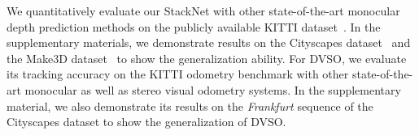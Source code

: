 \documentclass[runningheads]{llncs}
\begin{document}
We quantitatively evaluate our StackNet with 
other state-of-the-art monocular depth 
prediction methods on the 
publicly available KITTI 
dataset~\cite{Geiger2013IJRR}. In the supplementary materials, we 
demonstrate results on the Cityscapes 
dataset~\cite{Cordts2016Cityscapes} and the 
Make3D dataset~\cite{saxena2006learning} to 
show the generalization ability. 
For DVSO, we evaluate its tracking
accuracy on the KITTI odometry benchmark with 
other state-of-the-art monocular as well as 
stereo visual odometry systems. In the supplementary material, we also 
demonstrate its results on the \textit{Frankfurt} sequence of the Cityscapes 
dataset to show the generalization of DVSO.
	\centering
\end{document}
